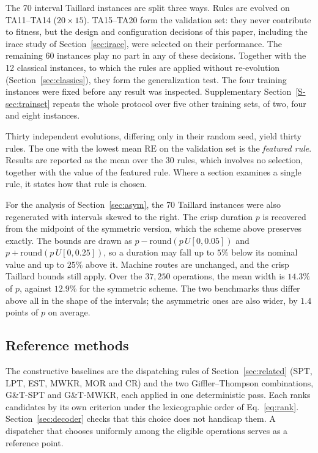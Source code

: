 \documentclass[preprint,number,sort&compress,12pt]{elsarticle}
\newcommand{\RE}{\mathrm{RE}}
\begin{document}
The 70 interval Taillard instances are split three ways. Rules are
evolved on TA11--TA14 ($20{\times}15$). TA15--TA20 form the
validation set: they never contribute to fitness, but the design and
configuration decisions of this paper, including the irace study of
Section~\ref{sec:irace}, were selected on their performance. The
remaining 60 instances play no part in any of these decisions. Together
with the 12 classical instances, to which the rules are applied without
re-evolution (Section~\ref{sec:classics}), they form the generalization
test. The four training instances were fixed before any result was
inspected. Supplementary Section~\ref{S-sec:trainset} repeats the whole
protocol over five other training sets, of two, four and eight
instances.

Thirty independent evolutions, differing only in their random seed,
yield thirty rules. The one with the lowest mean $\RE$ on the validation
set is the \emph{featured rule}. Results are reported as the mean over
the 30 rules, which involves no selection, together with the value of
the featured rule. Where a section examines a single rule, it states how
that rule is chosen.

For the analysis of Section~\ref{sec:asym}, the 70 Taillard instances
were also regenerated with intervals skewed to the right. The crisp
duration $p$ is recovered from the midpoint of the symmetric version,
which the scheme above preserves exactly. The bounds are drawn as
$p - \mathrm{round}(p\,U[0,0.05])$ and
$p + \mathrm{round}(p\,U[0,0.25])$, so a duration may fall up to $5\%$
below its nominal value and up to $25\%$ above it. Machine routes are
unchanged, and the crisp Taillard bounds still apply. Over the
$37{,}250$ operations, the mean width is $14.3\%$ of $p$, against
$12.9\%$ for the symmetric scheme. The two benchmarks thus differ above
all in the shape of the intervals; the asymmetric ones are also wider,
by $1.4$ points of $p$ on average.


\subsection{Reference methods}
\label{sec:reference}
The constructive baselines are the dispatching rules of
Section~\ref{sec:related} (SPT, LPT, EST, MWKR, MOR and CR) and the two
Giffler--Thompson combinations, G\&T-SPT and G\&T-MWKR, each applied in
one deterministic pass. Each ranks candidates by its own criterion under
the lexicographic order of Eq.~\eqref{eq:rank}.
Section~\ref{sec:decoder} checks that this choice does not handicap
them. A dispatcher that chooses uniformly
among the eligible operations serves as a reference point.
\end{document}
